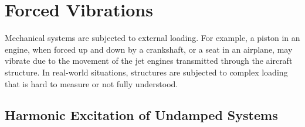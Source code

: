 \documentclass[12pt,letter]{article}
\begin{document}
	
	\setcounter{section}{2}	
	\setcounter{figure}{0}   
	\renewcommand\thefigure{\thesection.\arabic{figure}}
	\setcounter{equation}{0}   
	\renewcommand\theequation{\thesection.\arabic{equation}}

\section{Forced Vibrations}

 Mechanical systems are subjected to external loading. For example, a piston in an engine, when forced up and down by a crankshaft, or a seat in an airplane, may vibrate due to the movement of the jet engines transmitted through the aircraft structure.  In real-world situations, structures are subjected to complex loading that is hard to measure or not fully understood. 




\subsection{Harmonic Excitation of Undamped Systems}
\end{document}
